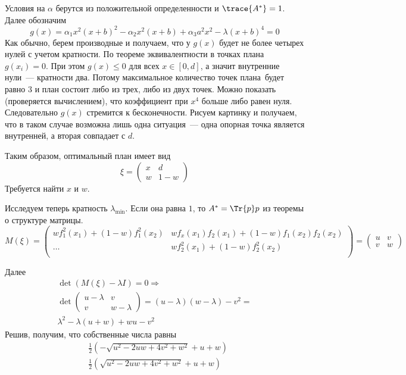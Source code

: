 Условия на $\alpha$ берутся из положительной определенности и $\trace{A^*}=1$. Далее обозначим
$$g(x) = \alpha_1x^2(x+b)^2  - \alpha_2 x^2 (x+b) + \alpha_3 a^2 x^2 - \lambda (x+b)^4 = 0$$
Как обычно, берем производные и получаем, что у $g(x)$ будет не более четырех нулей с учетом кратности. По теореме эквивалентности в точках плана $g(x_i) = 0$. При этом $g(x) \leq 0$ для всех $x \in [0,d]$, а значит 
внутренние нули — кратности два. Потому максимальное количество точек плана будет равно 3 и план состоит либо из трех, либо из двух точек. Можно показать (проверяется вычислением), что коэффициент при $x^4$ больше либо равен нуля. Следовательно $g(x)$ стремится к бесконечности. Рисуем картинку и получаем, что в таком случае возможна лишь одна ситуация — одна опорная точка является внутренней, а вторая совпадает с $d$. 

Таким образом, оптимальный план имеет вид
$$\xi = \begin{pmatrix} x & d \\ w & 1 -w \end{pmatrix}$$
Требуется найти $x$ и $w$.

Исследуем теперь кратность $\lambda_{\min}$. Если она равна $1$, то $A^{*}= \Tr{p}p$ из теоремы о структуре матрицы. 
\begin{equation}
M(\xi) = \begin{pmatrix}
wf_1^2(x_1) + (1-w)f_1^2(x_2) & wf_x(x_1)f_2(x_1) + (1-w)f_1(x_2)f_2(x_2) \\
… & wf_2^2(x_1) + (1-w) f_2^2(x_2) \\ 
\end{pmatrix} = \begin{pmatrix} u & v \\ v & w \end{pmatrix}
\end{equation}

Далее 
\begin{equation}
\begin{split}
\det\left(M(\xi) - \lambda I\right) = 0 \Rightarrow \\
\det \begin{pmatrix} u - \lambda  & v \\ v & w - \lambda\end{pmatrix} = (u - \lambda)(w-\lambda) - v^2  = \\
\lambda^2 - \lambda(u + w) + wu - v^2 
\end{split}
\end{equation}
Решив, получим, что собственные числа равны
\begin{equation}
\begin{split}
&\frac{1}{2} \left(-\sqrt{u^2-2 u w+4 v^2+w^2}+u+w\right)\\
&\frac{1}{2} \left(\sqrt{u^2-2 u w+4 v^2+w^2}+u+w\right)
\end{split}
\end{equation}

